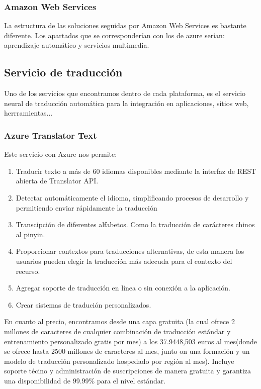 \documentclass[runningheads]{llncs}
\begin{document}
    \subsubsection{Amazon Web Services}
    La estructura de las soluciones seguidas por Amazon Web Services es bastante diferente. Los apartados que se corresponderían con los de azure serían: aprendizaje automático y servicios multimedia.


\subsection{Servicio de traducción}
Uno de los servicios que encontramos dentro de cada plataforma, es el servicio neural de traducción automática para la integración en aplicaciones, sitios web, herrramientas...
    \subsubsection{Azure Translator Text}
Este servicio con Azure nos permite:
\begin{enumerate}
    \item Traducir texto a más de 60 idiomas disponibles mediante la interfaz de REST abierta de Translator API.
    \item Detectar automáticamente el idioma, simplificando procesos de desarrollo y permitiendo enviar rápidamente la traducción
    \item Transcipción de diferentes alfabetos. Como la traducción de carácteres chinos al pinyin.
    \item Proporcionar contextos para traducciones alternativas, de esta manera los usuarios pueden elegir la traducción más adecuda para el contexto del recurso.
    \item Agregar soporte de traducción en línea o sin conexión a la aplicación.
    \item Crear sistemas de tradución personalizados.
\end{enumerate}{}
En cuanto al precio, encontramos desde una capa gratuita (la cual ofrece 2 millones de caracteres de cualquier combinación de traducción estándar y entrenamiento personalizado gratis por mes) a los 37.9448,503 euros al mes(donde se ofrece hasta 2500 millones de caracteres al mes, junto on una formación y un modelo de traducción personalizado hospedado por región al mes). Incluye soporte técino y administración de suscripciones de manera gratuita y garantiza una disponibilidad de 99.99\% para el nivel estándar.
\end{document}
